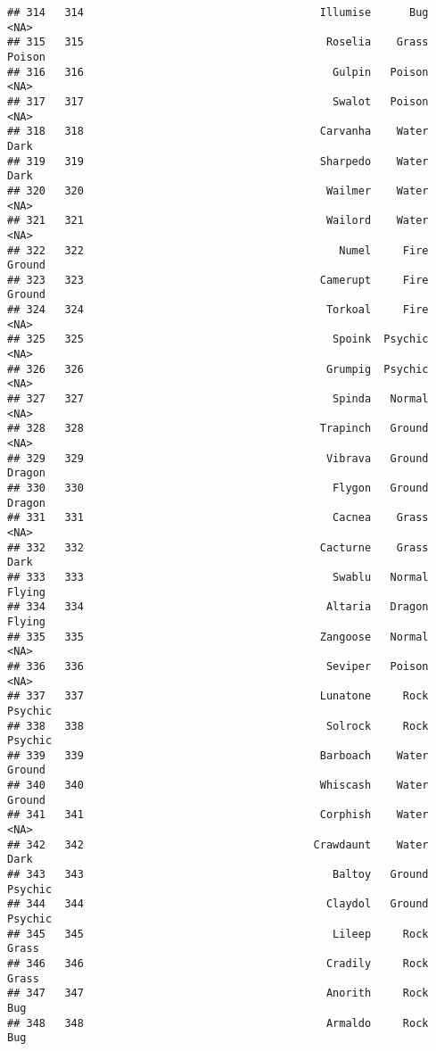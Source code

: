 \documentclass[
]{article}
\begin{document}
\begin{verbatim}
## 314   314                                     Illumise      Bug     <NA>
## 315   315                                      Roselia    Grass   Poison
## 316   316                                       Gulpin   Poison     <NA>
## 317   317                                       Swalot   Poison     <NA>
## 318   318                                     Carvanha    Water     Dark
## 319   319                                     Sharpedo    Water     Dark
## 320   320                                      Wailmer    Water     <NA>
## 321   321                                      Wailord    Water     <NA>
## 322   322                                        Numel     Fire   Ground
## 323   323                                     Camerupt     Fire   Ground
## 324   324                                      Torkoal     Fire     <NA>
## 325   325                                       Spoink  Psychic     <NA>
## 326   326                                      Grumpig  Psychic     <NA>
## 327   327                                       Spinda   Normal     <NA>
## 328   328                                     Trapinch   Ground     <NA>
## 329   329                                      Vibrava   Ground   Dragon
## 330   330                                       Flygon   Ground   Dragon
## 331   331                                       Cacnea    Grass     <NA>
## 332   332                                     Cacturne    Grass     Dark
## 333   333                                       Swablu   Normal   Flying
## 334   334                                      Altaria   Dragon   Flying
## 335   335                                     Zangoose   Normal     <NA>
## 336   336                                      Seviper   Poison     <NA>
## 337   337                                     Lunatone     Rock  Psychic
## 338   338                                      Solrock     Rock  Psychic
## 339   339                                     Barboach    Water   Ground
## 340   340                                     Whiscash    Water   Ground
## 341   341                                     Corphish    Water     <NA>
## 342   342                                    Crawdaunt    Water     Dark
## 343   343                                       Baltoy   Ground  Psychic
## 344   344                                      Claydol   Ground  Psychic
## 345   345                                       Lileep     Rock    Grass
## 346   346                                      Cradily     Rock    Grass
## 347   347                                      Anorith     Rock      Bug
## 348   348                                      Armaldo     Rock      Bug

\end{verbatim}
\end{document}
